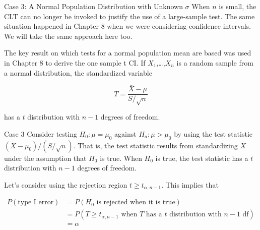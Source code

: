 \documentclass[
  ignorenonframetext,
]{beamer}
\begin{document}
\begin{frame}{Case 3: A Normal Population Distribution with Unknown
\(\sigma\)}
\protect\hypertarget{case-3-a-normal-population-distribution-with-unknown-sigma}{}
When \(n\) is small, the CLT can no longer be invoked to justify the use
of a large-sample test. The same situation happened in Chapter 8 when we
were considering confidence intervals. We will take the same approach
here too.

The key result on which tests for a normal population mean are based was
used in Chapter 8 to derive the one sample t CI. If
\(X_{1}\),\ldots,\(X_{n}\) is a random sample from a normal
distribution, the standardized variable

\[
T = \frac{\bar{X} - \mu}{S/\sqrt{n}}
\]

has a \(t\) distribution with \(n-1\) degrees of freedom.
\end{frame}

\begin{frame}{Case 3}
\protect\hypertarget{case-3}{}
Consider testing \(H_{0}: \mu = \mu_{0}\) against
\(H_{a}: \mu > \mu_{0}\) by using the test statistic
\((\bar{X} - \mu_{0})/(S/\sqrt{n})\). That is, the test statistic
results from standardizing \(\bar{X}\) under the assumption that
\(H_{0}\) is true. When \(H_{0}\) is true, the test statistic has a
\(t\) distribution with \(n-1\) degrees of freedom.

Let's consider using the rejection region \(t \geq t_{\alpha,n-1}\).
This implies that

\[
\begin{aligned}
P(\text{type I error}) &= P(H_{0} \text{ is rejected when it is true}) \\
&= P(T \geq t_{\alpha,n-1} \text{ when } T \text{ has a } t \text{ distribution with } n-1 \text{ df}) \\ 
&= \alpha
\end{aligned}
\]
\end{frame}
\end{document}
